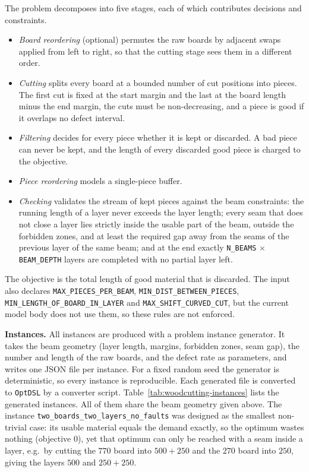 \documentclass[11pt,a4paper]{article}
\begin{document}
\begin{sloppypar}
The problem decomposes into five stages, each of which contributes decisions
and constraints.
\begin{itemize}
\item \emph{Board reordering} (optional) permutes the raw boards by adjacent
swaps applied from left to right, so that the cutting stage sees them in a
different order.
\item \emph{Cutting} splits every board at a bounded number of cut positions
into pieces. The first cut is fixed at the start margin and the last at the
board length minus the end margin, the cuts must be non-decreasing, and a
piece is good if it overlaps no defect interval.
\item \emph{Filtering} decides for every piece whether it is kept or
discarded. A bad piece can never be kept, and the length of every discarded
good piece is charged to the objective.
\item \emph{Piece reordering} models a single-piece buffer.
\item \emph{Checking} validates the stream of kept pieces against the beam
constraints: the running length of a layer never exceeds the layer length;
every seam that does not close a layer lies strictly inside the usable part of
the beam, outside the forbidden zones, and at least the required gap away from
the seams of the previous layer of the same beam; and at the end exactly
\texttt{N\_BEAMS} $\times$ \texttt{BEAM\_DEPTH} layers are completed with no
partial layer left.
\end{itemize}
The objective is the total length of good material that is discarded.
The input also declares \texttt{MAX\_PIECES\_PER\_BEAM},
\texttt{MIN\_DIST\_BETWEEN\_PIECES}, \texttt{MIN\_LENGTH\_OF\_BOARD\_IN\_LAYER}
and \texttt{MAX\_SHIFT\_CURVED\_CUT}, but the current model body does not use
them, so these rules are not enforced.
\end{sloppypar}

\begin{sloppypar}
\textbf{Instances.}
All instances are produced with a problem instance generator.
It takes the beam geometry (layer length, margins, forbidden zones, seam gap),
the number and length of the raw boards, and the defect rate as parameters,
and writes one JSON file per instance.
For a fixed random seed the generator is deterministic, so every instance is
reproducible.
Each generated file is converted to \texttt{OptDSL} by a converter script.
Table~\ref{tab:woodcutting-instances} lists the generated instances.
All of them share the beam geometry given above.
The instance \texttt{two\_boards\_two\_layers\_no\_faults} was designed as
the smallest non-trivial case: its usable material equals the demand exactly,
so the optimum wastes nothing (objective $0$), yet that optimum can only be
reached with a seam inside a layer, e.g.\ by cutting the $770$ board into
$500 + 250$ and the $270$ board into $250$, giving the layers $500$ and
$250 + 250$.
\end{sloppypar}
\end{document}

